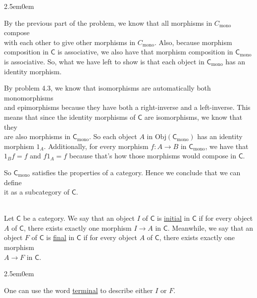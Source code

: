 \documentclass{book}
\newcommand{\hOne}{%
   \color{Black}%
   \fontsize{14}{16}\selectfont%
}
\newenvironment{myIndent}{%
   \begin{adjustwidth}{2.5em}{0em}%
}{%
   \end{adjustwidth}%
}
\newcommand{\udefine}[1]{{%
   \setulcolor{Red}%
   \setul{0.14em}{0.07em}%
   \ul{#1}%
}}
\newcommand{\myObj}{\mathrm{Obj}}
\newcommand{\mcateg}[1]{\mathsf{#1}}
\newcommand{\mySepTwo}[1][.]{%
   {\noindent\color{#1}{\rule{6.5in}{0.5mm}}}\\%
}
\newcommand{\retTwo}{\hfill\bigbreak}
\begin{document}
\begin{itemize}
{\begin{myIndent}
      By the previous part of the problem, we know that all morphisms in $C_{\mathrm{mono}}$ compose\\ with each other to give other morphisms in $C_{\mathrm{mono}}$. Also, because morphism\\ composition in $\mcateg{C}$ is associative, we also have that morphism composition in $\mcateg{C}_{\mathrm{mono}}$\\ is associative. So, what we have left to show is that each object in $\mcateg{C}_{\mathrm{mono}}$ has an\\ identity morphism.

      \newpage

      By problem 4.3, we know that isomorphisms are automatically both monomorphisms\\ and epimorphisms because they have both a right-inverse and a left-inverse. This\\ means that since the identity morphisms of $\mcateg{C}$ are isomorphisms, we know that they\\ are also morphisms in $\mcateg{C}_{\mathrm{mono}}$. So each object $A$ in $\myObj(\mcateg{C}_{\mathrm{mono}})$ has an identity\\ morphism $1_A$. Additionally, for every morphism $f: A \longrightarrow B$ in $\mcateg{C}_{\mathrm{mono}}$, we have that\\ $1_B f = f$ and $f 1_A = f$ because that's how those morphisms would compose in $\mcateg{C}$.\retTwo

      So $\mcateg{C}_{\mathrm{mono}}$ satisfies the properties of a category. Hence we conclude that we can define\\ it as a subcategory of $\mcateg{C}$.
   \end{myIndent}}
\end{itemize}

\hOne\mySepTwo

Let $\mcateg{C}$ be a category. We say that an object $I$ of $\mcateg{C}$ is \udefine{initial} in $\mcateg{C}$ if for every object\\ $A$ of $\mcateg{C}$, there exists exactly one morphism $I \longrightarrow A$ in $\mcateg{C}$. Meanwhile, we say that an\\ object $F$ of $\mcateg{C}$ is \udefine{final} in $\mcateg{C}$ if for every object $A$ of $\mcateg{C}$, there exists exactly one morphism\\ $A \longrightarrow F$ in $\mcateg{C}$.
\begin{myIndent}
   One can use the word \udefine{terminal} to describe either $I$ or $F$.
\end{myIndent}
\end{document}

